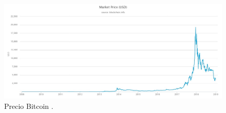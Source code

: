 \begin{figure}
	\centering
	\includegraphics[width=1\textwidth]{imagenes/market-price-(usd).jpeg}
	\caption{\label{fig1}Precio Bitcoin \cite{blockchaininfo}.}
\end{figure}

